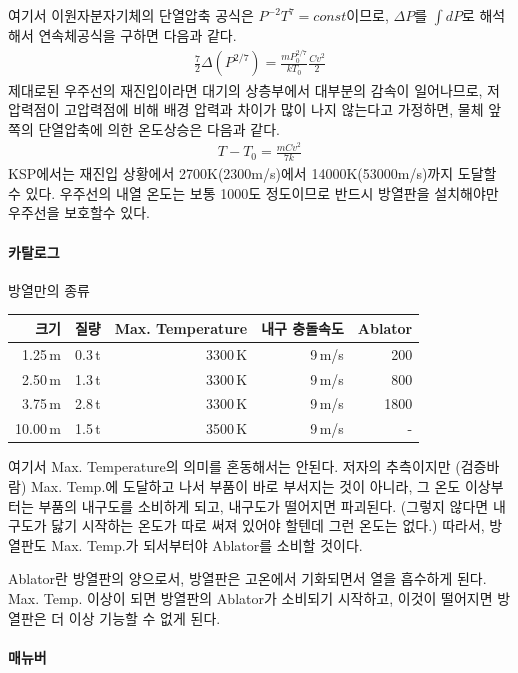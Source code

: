 \documentclass[9pt]{amsbook}
\begin{document}
여기서 이원자분자기체의 단열압축 공식은 $P^{-2}T^7=const$이므로, $\Delta P$를 $\int dP$로 해석해서 연속체공식을 구하면 다음과 같다.
\begin{align}
	\frac{7}{2}\Delta(P^{2/7}) = \frac{mP_0^{2/7}}{kT_0} \frac{Cv^2}{2}
\end{align}
제대로된 우주선의 재진입이라면 대기의 상층부에서 대부분의 감속이 일어나므로, 저압력점이 고압력점에 비해 배경 압력과 차이가 많이 나지 않는다고 가정하면, 물체 앞쪽의 단열압축에 의한 온도상승은 다음과 같다.
\begin{align}
T-T_0 = \frac{mCv^2}{7k}
\end{align}
KSP에서는 재진입 상황에서 2700K(2300m/s)에서 14000K(53000m/s)까지 도달할 수 있다. 우주선의 내열 온도는 보통 1000도 정도이므로 반드시 방열판을 설치해야만 우주선을 보호할수 있다.

\paragraph{카탈로그}
\par
\begin{threeparttable}
\caption{방열만의 종류}
\begin{tabular}{|r|r|r|r|r|}
\hline
크기&질량& Max. Temperature& 내구 충돌속도& Ablator
\\\hline
1.25\,m&0.3\,t& 3300\,K&9\,m/s&200
\\2.50\,m&1.3\,t&3300\,K&9\,m/s&800
\\3.75\,m&2.8\,t&3300\,K&9\,m/s&1800
\\10.00\,m&1.5\,t&3500\,K&9\,m/s&-
\\\hline
\end{tabular}
\end{threeparttable}

여기서 Max. Temperature의 의미를 혼동해서는 안된다. 저자의 추측이지만 (검증바람) Max. Temp.에 도달하고 나서 부품이 바로 부서지는 것이 아니라, 그 온도 이상부터는 부품의 내구도를 소비하게 되고, 내구도가 떨어지면 파괴된다. (그렇지 않다면 내구도가 닳기 시작하는 온도가 따로 써져 있어야 할텐데 그런 온도는 없다.) 따라서, 방열판도 Max. Temp.가 되서부터야 Ablator를 소비할 것이다.

Ablator란 방열판의 양으로서, 방열판은 고온에서 기화되면서 열을 흡수하게 된다. Max. Temp. 이상이 되면 방열판의 Ablator가 소비되기 시작하고, 이것이 떨어지면 방열판은 더 이상 기능할 수 없게 된다.
\paragraph{매뉴버}
\end{document}
